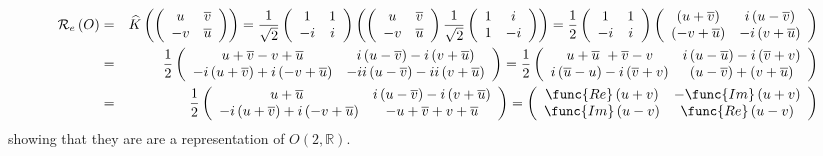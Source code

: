 \documentclass[aps,preprint]{revtex4}
\begin{document}
\begin{eqnarray}
\mathcal{R}_{e}\left( O\right) &=&\widehat{K}\left( \left( 
\begin{array}{cc}
u & \overline{v} \\ 
-v & \overline{u}%
\end{array}%
\right) \right) =\frac{1}{\sqrt{2}}\left( 
\begin{array}{cc}
1 & 1 \\ 
-i & i%
\end{array}%
\right) \left( \left( 
\begin{array}{cc}
u & \overline{v} \\ 
-v & \overline{u}%
\end{array}%
\right) \frac{1}{\sqrt{2}}\left( 
\begin{array}{cc}
1 & i \\ 
1 & -i%
\end{array}%
\right) \right) =\frac{1}{2}\left( 
\begin{array}{cc}
1 & 1 \\ 
-i & i%
\end{array}%
\right) \left( 
\begin{array}{cc}
\left( u+\overline{v}\right) & i\left( u-\overline{v}\right) \\ 
\left( -v+\overline{u}\right) & -i\left( v+\overline{u}\right)%
\end{array}%
\right) \\
&=&\frac{1}{2}\left( 
\begin{array}{cc}
u+\overline{v}-v+\overline{u} & i\left( u-\overline{v}\right) -i\left( v+%
\overline{u}\right) \\ 
-i\left( u+\overline{v}\right) +i\left( -v+\overline{u}\right) & -ii\left( u-%
\overline{v}\right) -ii\left( v+\overline{u}\right)%
\end{array}%
\right) =\frac{1}{2}\left( 
\begin{array}{cc}
u+\overline{u}\ +\overline{v}-v & i\left( u-\overline{u}\right) -i\left( 
\overline{v}+v\right) \\ 
i\left( \overline{u}-u\right) -i\left( \overline{v}+v\right) & \left( u-%
\overline{v}\right) +\left( v+\overline{u}\right)%
\end{array}%
\right) \\
&=&\frac{1}{2}\left( 
\begin{array}{cc}
u+\overline{u}\  & i\left( u-\overline{v}\right) -i\left( v+\overline{u}%
\right) \\ 
-i\left( u+\overline{v}\right) +i\left( -v+\overline{u}\right) & -u+%
\overline{v}+v+\overline{u}%
\end{array}%
\right) =\left( 
\begin{array}{cc}
\func{Re}\left( u+v\right) & -\func{Im}\left( u+v\right) \\ 
\func{Im}\left( u-v\right) & \func{Re}\left( u-v\right)%
\end{array}%
\right)
\end{eqnarray}%
showing that they are are a representation of $O\left( 2,\mathbb{R}\right) .$
\end{document}
